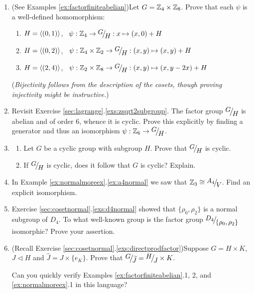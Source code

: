 \begin{exercises}
\begin{enumerate}
	
	 	\item (See Examples \ref{ex:factorfiniteabelian})\lstsp Let $G=\mathbb{Z}_4\times\mathbb{Z}_8$. Prove that each $\psi$ is a well-defined homomorphism:
		\begin{enumerate}\itemsep0pt
			\item $H=\left\langle (0,1)\right\rangle$, \ $\psi:\Z_4\to\quotient GH:x\mapsto (x,0)+H$
			\item $H=\left\langle (0,2)\right\rangle$, \ $\psi:\Z_4\times\Z_2\to\quotient GH:(x,y)\mapsto (x,y)+H$
			\item $H=\left\langle (2,4)\right\rangle$, \ $\psi:\Z_2\times\Z_8\to\quotient GH:(x,y)\mapsto (x,y-2x)+H$
		\end{enumerate}
		(\emph{Bijectivity follows from the description of the cosets, though proving injectivity might be instructive.})
		
		
		\item Revisit Exercise \ref*{sec:lagrange}.\ref{exs:zsqrt2subgroup}. The factor group $\quotient GH$ is abelian and of order 6, whence it is cyclic. Prove this explicitly by finding a generator and thus an isomorphism $\psi:\Z_6\to\quotient GH$.
		
		
		\item\begin{enumerate}
	  	\item Let $G$ be a cyclic group with subgroup $H$. Prove that $\quotient GH$ is cyclic.
	  	\item If $\quotient GH$ is cyclic, does it follow that $G$ is cyclic? Explain.
		\end{enumerate}
	
	
		\item In Example \ref*{ex:normalmoreex}.\ref{ex:a4normal} we saw that $\Z_3\cong\quotient{A_4}{V}$. Find an explicit isomorphism.
	
	
		\item Exercise \ref*{sec:cosetnormal}.\ref{exs:d4normal} showed that $\{\rho_0,\rho_2\}$ is a normal subgroup of $D_4$. To what well-known group is the factor group $\quotient{D_4}{\{\rho_0,\rho_2\}}$ isomorphic? Prove your assertion.
		
		
		\item\label{exs:normaldirectfactor} (Recall Exercise \ref*{sec:cosetnormal}.\ref{exs:directprodfactor})\lstsp Suppose $G=H\times K$, $J\triangleleft H$ and $\widehat J=J\times\{e_K\}$. Prove that $\quotient G{\widetilde J}=\quotient HJ\times K$.\par
		Can you quickly verify Examples \ref{ex:factorfiniteabelian}.1, 2, and \ref{ex:normalmoreex}.1 in this language?
		

\end{enumerate}
\end{exercises}
